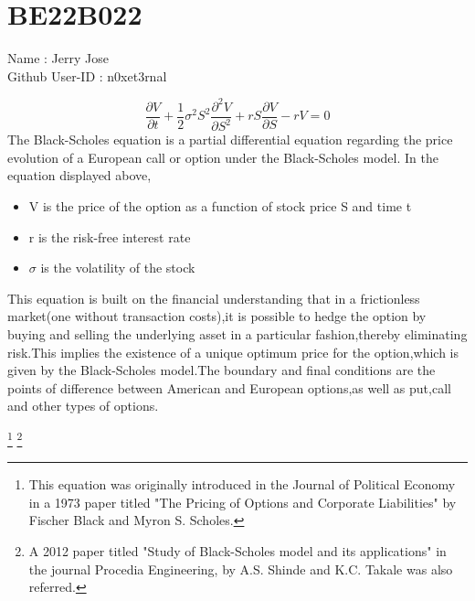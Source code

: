 \section{BE22B022}

Name : Jerry Jose\\
Github User-ID : n0xet3rnal

\begin{equation}
{\frac {\partial V}{\partial t}}+{\frac {1}{2}}\sigma ^{2}S^{2}{\frac {\partial ^{2}V}{\partial S^{2}}}+rS{\frac {\partial V}{\partial S}}-rV=0
\label{bs_pde}
\end{equation}
The Black-Scholes equation is a partial differential equation regarding the price evolution of a European call or option under the Black-Scholes model.
In the equation displayed above,
\begin{itemize}
\item V is the price of the option as a function of stock price S and time t
\item r is the risk-free interest rate
\item $\sigma$ is the volatility of the stock
\end{itemize}
This equation is built on the financial understanding that in a frictionless market(one without transaction costs),it is possible to hedge the option by buying and selling the underlying asset in a particular fashion,thereby eliminating risk.This implies the existence of a unique optimum price for the option,which is given by the Black-Scholes model.The boundary and final conditions are the points of difference between American and European options,as well as put,call
and other types of options.


\footnote{This equation was originally introduced in the Journal of Political Economy in a 1973 paper titled "The Pricing of Options and Corporate Liabilities" by Fischer Black and Myron S. Scholes.}
\footnote{A 2012 paper titled "Study of Black-Scholes model and its applications" in the journal Procedia Engineering, by A.S. Shinde and K.C. Takale was also referred.}
